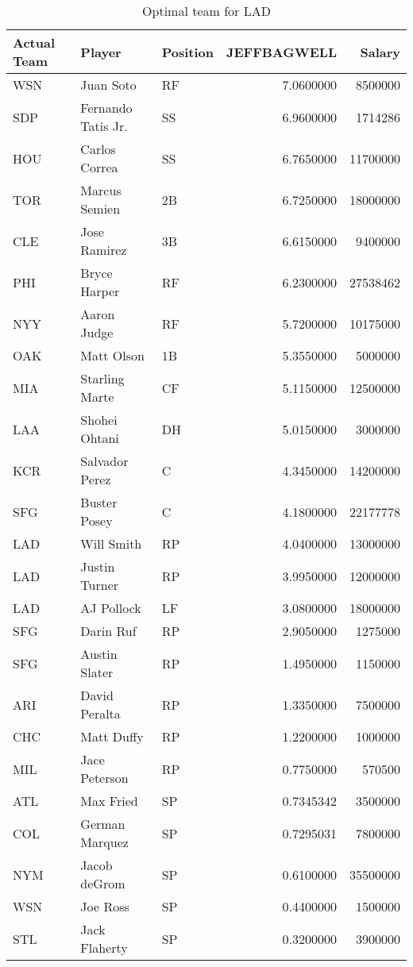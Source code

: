 \begin{table}

\caption{Optimal team for LAD}
\centering
\begin{tabular}[t]{l|l|l|r|r}
\hline
Actual Team & Player & Position & JEFFBAGWELL & Salary\\
\hline
WSN & Juan Soto & RF & 7.0600000 & 8500000\\
\hline
SDP & Fernando Tatis Jr. & SS & 6.9600000 & 1714286\\
\hline
HOU & Carlos Correa & SS & 6.7650000 & 11700000\\
\hline
TOR & Marcus Semien & 2B & 6.7250000 & 18000000\\
\hline
CLE & Jose Ramirez & 3B & 6.6150000 & 9400000\\
\hline
PHI & Bryce Harper & RF & 6.2300000 & 27538462\\
\hline
NYY & Aaron Judge & RF & 5.7200000 & 10175000\\
\hline
OAK & Matt Olson & 1B & 5.3550000 & 5000000\\
\hline
MIA & Starling Marte & CF & 5.1150000 & 12500000\\
\hline
LAA & Shohei Ohtani & DH & 5.0150000 & 3000000\\
\hline
KCR & Salvador Perez & C & 4.3450000 & 14200000\\
\hline
SFG & Buster Posey & C & 4.1800000 & 22177778\\
\hline
LAD & Will Smith & RP & 4.0400000 & 13000000\\
\hline
LAD & Justin Turner & RP & 3.9950000 & 12000000\\
\hline
LAD & AJ Pollock & LF & 3.0800000 & 18000000\\
\hline
SFG & Darin Ruf & RP & 2.9050000 & 1275000\\
\hline
SFG & Austin Slater & RP & 1.4950000 & 1150000\\
\hline
ARI & David Peralta & RP & 1.3350000 & 7500000\\
\hline
CHC & Matt Duffy & RP & 1.2200000 & 1000000\\
\hline
MIL & Jace Peterson & RP & 0.7750000 & 570500\\
\hline
ATL & Max Fried & SP & 0.7345342 & 3500000\\
\hline
COL & German Marquez & SP & 0.7295031 & 7800000\\
\hline
NYM & Jacob deGrom & SP & 0.6100000 & 35500000\\
\hline
WSN & Joe Ross & SP & 0.4400000 & 1500000\\
\hline
STL & Jack Flaherty & SP & 0.3200000 & 3900000\\
\hline
\end{tabular}
\end{table}
